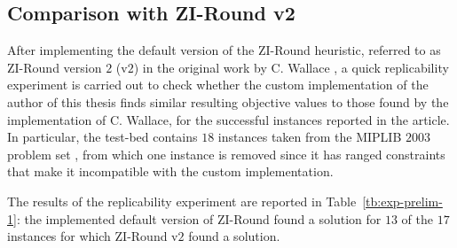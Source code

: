 \documentclass[a4paper,12pt,twoside]{scrbook}
\begin{document}
\subsection{Comparison with ZI-Round v2}
After implementing the default version of the ZI-Round heuristic, referred to as ZI-Round version $2$ (v$2$) in the original work by C. Wallace \cite{wallace2010}, a quick replicability experiment is carried out to check whether the custom implementation of the author of this thesis finds similar resulting objective values to those found by the implementation of C. Wallace, for the successful instances reported in the article. In particular, the test-bed contains $18$ instances taken from the MIPLIB $2003$ problem set \cite{miplib2003}, from which one instance is removed since it has ranged constraints that make it incompatible with the custom implementation. \par
The results of the replicability experiment are reported in Table~\ref{tb:exp-prelim-1}: the implemented default version of ZI-Round found a solution for $13$ of the $17$ instances for which ZI-Round v$2$ found a solution.
\end{document}

